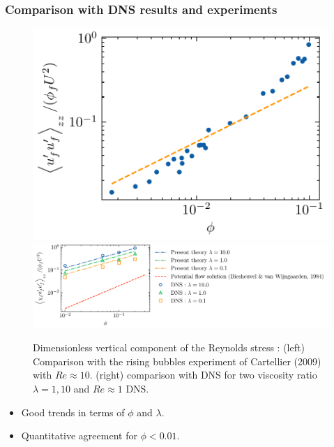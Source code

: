 \documentclass{sintefbeamer}
\begin{document}
  \begin{frame}
  \frametitle{Comparison with DNS results and experiments}
  \begin{figure}[h!]
    \centering    
    \includegraphics[height = 0.25\textwidth]{image/HOMOGENEOUS_final/CA/cartellier.pdf}
    \includegraphics[height = 0.25\textwidth]{image/HOMOGENEOUS_final/CA/UUyy_Ga_5.pdf}
    \caption{
       Dimensionless vertical component of the Reynolds stress :
       (left) Comparison with the rising bubbles experiment of Cartellier (2009) with $Re \approx 10$. 
       (right) comparison with DNS for two viscosity ratio $\lambda =1,10$ and $Re \approx 1$ DNS. 
    }
    \label{fig:Cp}
\end{figure}  
\begin{itemize}
  \item Good trends in terms of $\phi$ and $\lambda$.  
  \item Quantitative agreement for $\phi < 0.01$.  
\end{itemize}
\end{frame}
\end{document}
